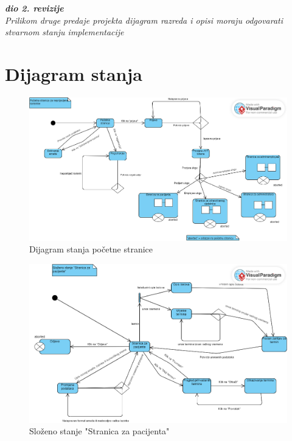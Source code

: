 			
			\textbf{\textit{dio 2. revizije}}\\			
			
			\textit{Prilikom druge predaje projekta dijagram razreda i opisi moraju odgovarati stvarnom stanju implementacije}
			
			
			
			\eject
		
		\section{Dijagram stanja}
			
			
		\begin{figure}[H]
			\includegraphics[scale=0.4]{slike/DijagramStanja1.PNG} %
			\centering
			\caption{Dijagram stanja početne stranice}
			\label{fig:promjene}
		\end{figure}
		
			\begin{figure}[H]
			\includegraphics[scale=0.4]{slike/DijagramStanja2.PNG} %
			\centering
			\caption{Složeno stanje "Stranica za pacijenta"}
			\label{fig:promjene}
		\end{figure}
		
